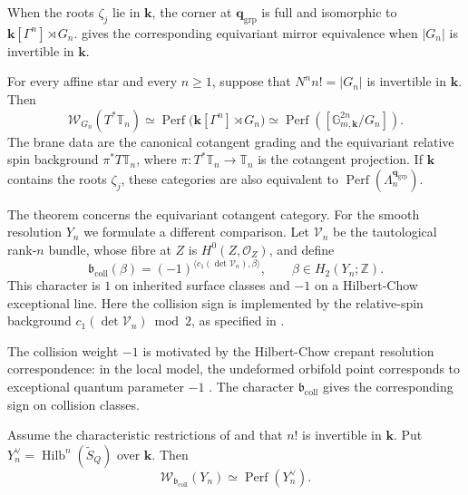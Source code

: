 \documentclass[a4paper]{amsart}
\newcommand{\kk}{\mathbf{k}}
\newcommand{\ZZ}{\mathbb{Z}}
\DeclareMathOperator{\Perf}{Perf}
\numberwithin{equation}{section}
\begin{document}
When the roots $\zeta_j$ lie in $\kk$, the corner at
$\boldsymbol q_{\mathrm{grp}}$ is full and isomorphic to
$\kk[\Gamma^n]\rtimes G_n$.  gives the
corresponding equivariant mirror equivalence when $|G_n|$ is
invertible in $\kk$.

\begin{theorem}\label{thm:higher-orbifold}
For every affine star and every $n\ge1$, suppose that
$N^n n!=|G_n|$ is invertible in $\kk$. Then
\[
 \mathcal W_{G_n}(T^*\mathbb{T}_n)
 \simeq\Perf\bigl(\kk[\Gamma^n]\rtimes G_n\bigr)
 \simeq\Perf([\mathbb G_{m,\kk}^{2n}/G_n]).
\]
The brane data are the canonical cotangent grading and the
equivariant relative spin background $\pi^*T\mathbb{T}_n$, where
$\pi:T^*\mathbb{T}_n\to\mathbb{T}_n$ is the cotangent projection.
If $\kk$ contains the roots $\zeta_j$, these categories are also
equivalent to $\Perf(\Lambda_n^{\boldsymbol q_{\mathrm{grp}}})$.
\end{theorem}

The theorem concerns the equivariant cotangent category. For the
smooth resolution $Y_n$ we formulate a different comparison.
Let $\mathcal V_n$ be the tautological rank-$n$ bundle, whose fibre
at $Z$ is $H^0(Z,\mathcal O_Z)$, and define
\begin{equation}\label{eq:collision-bulk}
 \mathfrak b_{\mathrm{coll}}(\beta)
    =(-1)^{\langle c_1(\det\mathcal V_n),\beta\rangle},
 \qquad \beta\in H_2(Y_n;\ZZ).
\end{equation}
This character is $1$ on inherited surface classes and $-1$ on
a Hilbert-Chow exceptional line. Here the collision sign is
implemented by the relative-spin background
$c_1(\det\mathcal V_n)\bmod2$, as specified in .

The collision weight $-1$ is motivated by the Hilbert-Chow crepant
resolution correspondence: in the local model, the undeformed orbifold
point corresponds to exceptional quantum parameter $-1$
\cite[Theorem~3.11]{BryanGraber}. The character
$\mathfrak b_{\mathrm{coll}}$ gives the corresponding sign on collision
classes.

\begin{conjecture}\label{conj:hilbert-mirror}
Assume the characteristic restrictions of
 and that $n!$ is invertible in $\kk$.
Put $Y_n^\vee=\operatorname{Hilb}^n(\widetilde S_Q)$ over $\kk$.
Then
\[
 \mathcal W_{\mathfrak b_{\mathrm{coll}}}(Y_n)
       \simeq\Perf(Y_n^\vee).
\]
\end{conjecture}
\end{document}
